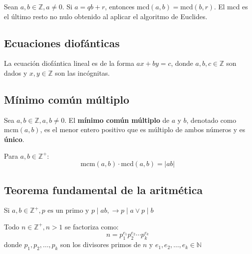 \documentclass[12pt]{article}
\begin{document}
\begin{tcolorbox}[title=Propiedad fundamental del algoritmo de Euclides]
    Sean \( a, b \in \mathbb{Z}, a \neq 0 \). Si \( a = qb + r \), entonces \( \text{mcd}(a, b) = \text{mcd}(b, r) \).
    El mcd es el último resto no nulo obtenido al aplicar el algoritmo de Euclides.
\end{tcolorbox}

\subsection*{Ecuaciones diofánticas}

\begin{tcolorbox}[title=Ecuación diofántica lineal con dos incógnitas]
La ecuación diofántica lineal es de la forma \( ax + by = c \), donde \( a, b, c \in \mathbb{Z} \) son dados y \( x, y \in \mathbb{Z} \) son las incógnitas.
\end{tcolorbox}

\newpage

\subsection*{Mínimo común múltiplo}

\begin{tcolorbox}[title=Mínimo común múltiplo]
Sea \( a, b \in \mathbb{Z}, a, b \neq 0 \). El \textbf{mínimo común múltiplo} de \( a \) y \( b \), denotado como \( \text{mcm}(a, b) \), es el menor entero positivo que es múltiplo de ambos números y es \textbf{único}.
\end{tcolorbox}

\begin{tcolorbox}[title=Relación entre mcd y mcm]
Para \( a, b \in \mathbb{Z}^+\):
\[ \text{mcm}(a, b) \cdot \text{mcd}(a, b) = |ab| \]
\end{tcolorbox}

\newpage

\subsection*{Teorema fundamental de la aritmética}

\begin{tcolorbox}[title=Teorema fundamental de la aritmética]
    Si \( a,b \in \mathbb{Z}^+, \textit{p} \text{ es un primo y } p \mid ab, \rightarrow p \mid a \lor p \mid b  \)
\end{tcolorbox}

\begin{tcolorbox}[title=Teorema fundamental de la aritmética: representación canónica]
    Todo \( n \in \mathbb{Z}^+, n > 1 \) se factoriza como:
    \[
    n = p_1^{e_1} p_2^{e_2} \cdots p_k^{e_k}
    \]
    donde \( p_1, p_2, \dots, p_k \) son los divisores primos de \( n \) 
    y \( e_1, e_2, \dots, e_k \in \mathbb{N}\)
\end{tcolorbox}
\end{document}
